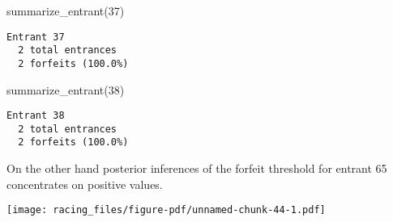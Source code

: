 \documentclass[
  letterpaper,
  DIV=11,
  numbers=noendperiod]{scrartcl}
\newenvironment{Shaded}{\begin{snugshade}}{\end{snugshade}}
\newcommand{\AttributeTok}[1]{\textcolor[rgb]{0.40,0.45,0.13}{#1}}
\newcommand{\DecValTok}[1]{\textcolor[rgb]{0.68,0.00,0.00}{#1}}
\newcommand{\FunctionTok}[1]{\textcolor[rgb]{0.28,0.35,0.67}{#1}}
\newcommand{\NormalTok}[1]{\textcolor[rgb]{0.00,0.23,0.31}{#1}}
\newcommand{\OtherTok}[1]{\textcolor[rgb]{0.00,0.23,0.31}{#1}}
\newcommand{\SpecialCharTok}[1]{\textcolor[rgb]{0.37,0.37,0.37}{#1}}
\newcommand{\StringTok}[1]{\textcolor[rgb]{0.13,0.47,0.30}{#1}}
\begin{document}
\begin{Shaded}
\begin{Highlighting}[]
\FunctionTok{summarize\_entrant}\NormalTok{(}\DecValTok{37}\NormalTok{)}
\end{Highlighting}
\end{Shaded}

\begin{verbatim}
Entrant 37
  2 total entrances
  2 forfeits (100.0%)
\end{verbatim}

\begin{Shaded}
\begin{Highlighting}[]
\FunctionTok{summarize\_entrant}\NormalTok{(}\DecValTok{38}\NormalTok{)}
\end{Highlighting}
\end{Shaded}

\begin{verbatim}
Entrant 38
  2 total entrances
  2 forfeits (100.0%)
\end{verbatim}

On the other hand posterior inferences of the forfeit threshold for
entrant 65 concentrates on positive values.

\begin{Shaded}
\end{Shaded}

\texttt{[image: racing\_files/figure-pdf/unnamed-chunk-44-1.pdf]}
\end{document}
